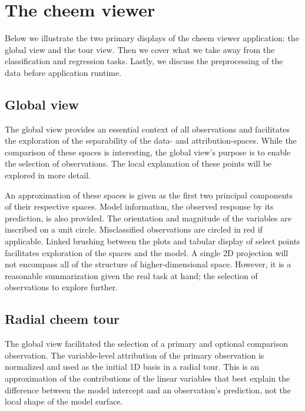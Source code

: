 \documentclass[
]{article}
\begin{document}
\hypertarget{sec:applicationdesign}{%
\section{The cheem viewer}\label{sec:applicationdesign}}

Below we illustrate the two primary displays of the cheem viewer
application: the global view and the tour view. Then we cover what we
take away from the classification and regression tasks. Lastly, we
discuss the preprocessing of the data before application runtime.

\hypertarget{global-view}{%
\subsection{Global view}\label{global-view}}

The global view provides an essential context of all observations and
facilitates the exploration of the separability of the data- and
attribution-spaces. While the comparison of these spaces is interesting,
the global view's purpose is to enable the selection of observations.
The local explanation of these points will be explored in more detail.

An approximation of these spaces is given as the first two principal
components of their respective spaces. Model information, the observed
response by its prediction, is also provided. The orientation and
magnitude of the variables are inscribed on a unit circle. Misclassified
observations are circled in red if applicable. Linked brushing between
the plots and tabular display of select points facilitates exploration
of the spaces and the model. A single 2D projection will not encompass
all of the structure of higher-dimensional space. However, it is a
reasonable summarization given the real task at hand; the selection of
observations to explore further.

\hypertarget{radial-cheem-tour}{%
\subsection{Radial cheem tour}\label{radial-cheem-tour}}

The global view facilitated the selection of a primary and optional
comparison observation. The variable-level attribution of the primary
observation is normalized and used as the initial 1D basis in a radial
tour. This is an approximation of the contributions of the linear
variables that best explain the difference between the model intercept
and an observation's prediction, not the local shape of the model
surface.
\end{document}
